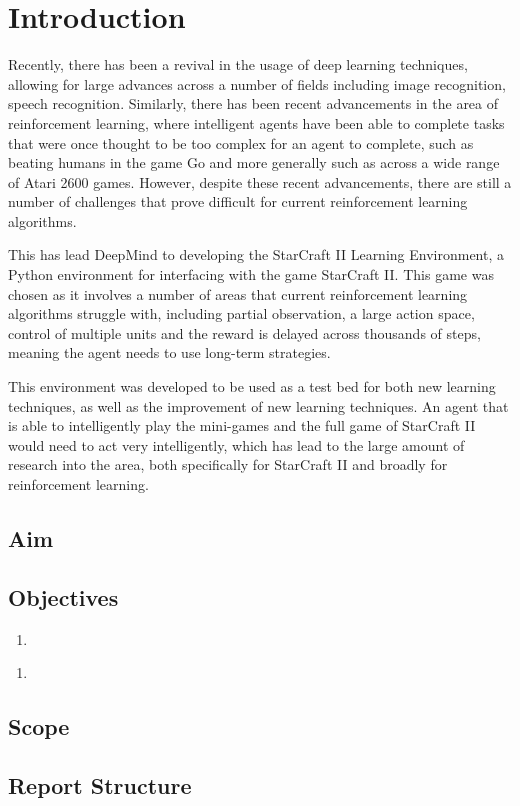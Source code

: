 \chapter{Introduction}%
\label{intro}

Recently, there has been a revival in the usage of deep
learning\cite{lecun2015deep} techniques, allowing for large advances across
a number of fields including image recognition\cite{krizhevsky2012imagenet},
speech recognition\cite{graves2013speech, hinton2012deep}. Similarly,
there has been recent advancements in the area of reinforcement learning,
where intelligent agents have been able to complete tasks that were once thought
to be too complex for an agent to complete, such as beating humans in the game
Go\cite{silver2016mastering} and more generally such as across a wide range of
Atari 2600 games\cite{mnih2015human}. However, despite these recent advancements,
there are still a number of challenges that prove difficult for current
reinforcement learning algorithms.

This has lead DeepMind\cite{deepmind} to developing the
StarCraft II Learning Environment\cite{vinyals2017starcraft}, a Python
environment for interfacing with the game StarCraft II\cite{pysc2, starcraft2}.
This game was chosen as it involves a number of areas that current reinforcement
learning algorithms struggle with, including partial observation, a large action
space, control of multiple units and the reward is delayed across thousands of
steps, meaning the agent needs to use long-term strategies.

This environment was developed to be used as a test bed for both new learning
techniques, as well as the improvement of new learning techniques. An agent
that is able to intelligently play the mini-games and the full game of
StarCraft II would need to act very intelligently, which has lead to the large amount
of research into the area, both specifically for StarCraft II and broadly for
reinforcement learning.

\section{Aim}

\section{Objectives}

\begin{enumerate}
    \item
\end{enumerate}

\begin{enumerate}
    \item
\end{enumerate}

\section{Scope}

\section{Report Structure}
